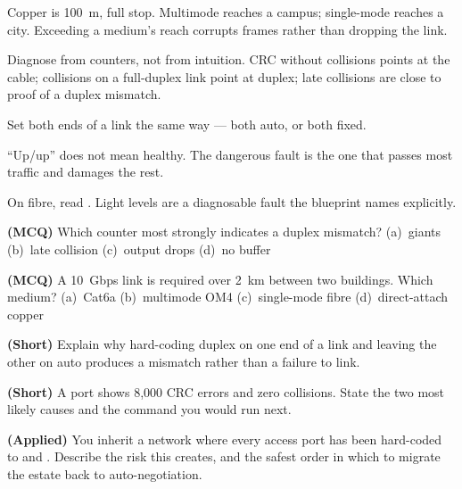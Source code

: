 \begin{chaptersummary}
\begin{tight}
  \item Copper is 100~m, full stop. Multimode reaches a campus; single-mode
        reaches a city. Exceeding a medium's reach corrupts frames rather than
        dropping the link.
  \item Diagnose from counters, not from intuition. CRC without collisions points
        at the cable; collisions on a full-duplex link point at duplex; late
        collisions are close to proof of a duplex mismatch.
  \item Set both ends of a link the same way --- both auto, or both fixed.
  \item ``Up/up'' does not mean healthy. The dangerous fault is the one that
        passes most traffic and damages the rest.
  \item On fibre, read . Light levels
        are a diagnosable fault the blueprint names explicitly.
\end{tight}
\end{chaptersummary}

\begin{reviewq}
  \item \textbf{(MCQ)} Which counter most strongly indicates a duplex mismatch?
        (a)~giants (b)~late collision (c)~output drops (d)~no buffer
  \item \textbf{(MCQ)} A 10~Gbps link is required over 2~km between two
        buildings. Which medium?
        (a)~Cat6a (b)~multimode OM4 (c)~single-mode fibre (d)~direct-attach copper
  \item \textbf{(Short)} Explain why hard-coding duplex on one end of a link and
        leaving the other on auto produces a mismatch rather than a failure to
        link.
  \item \textbf{(Short)} A port shows 8,000 CRC errors and zero collisions.
        State the two most likely causes and the command you would run next.
  \item \textbf{(Applied)} You inherit a network where every access port has been
        hard-coded to  and . Describe the risk
        this creates, and the safest order in which to migrate the estate back to
        auto-negotiation.
\end{reviewq}
